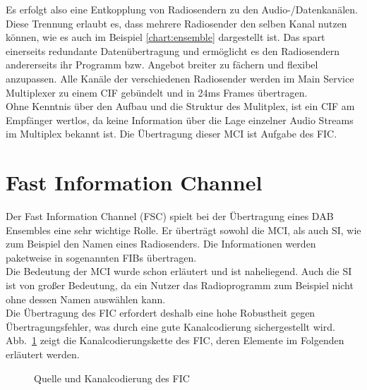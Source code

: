 Es erfolgt also eine Entkopplung von Radiosendern zu den Audio-/Datenkanälen. Diese Trennung erlaubt es, dass mehrere Radiosender den selben Kanal nutzen können, wie es auch im Beispiel \ref{chart:ensemble} dargestellt ist. Das spart einerseits redundante Datenübertragung und ermöglicht es den Radiosendern andererseits ihr Programm bzw. Angebot breiter zu fächern und flexibel anzupassen. Alle Kanäle der verschiedenen Radiosender werden im Main Service Multiplexer zu einem \ac{CIF} gebündelt und in 24ms Frames übertragen. \\
Ohne Kenntnis über den Aufbau und die Struktur des Mulitplex, ist ein \ac{CIF} am Empfänger wertlos, da keine Information über die Lage einzelner Audio Streams im Multiplex bekannt ist. Die Übertragung dieser \ac{MCI} ist Aufgabe des \ac{FIC}.

\section{Fast Information Channel}
\label{sec:FIC}
Der Fast Information Channel (FSC) spielt bei der Übertragung eines DAB Ensembles eine sehr wichtige Rolle. Er überträgt sowohl die \ac{MCI}, als auch \ac{SI}, wie zum Beispiel den Namen eines Radiosenders. Die Informationen werden paketweise in sogenannten \acp{FIB} übertragen.\\
Die Bedeutung der \ac{MCI} wurde schon erläutert und ist naheliegend. Auch die \ac{SI} ist von großer Bedeutung, da ein Nutzer das Radioprogramm zum Beispiel nicht ohne dessen Namen auswählen kann. \\
Die Übertragung des FIC erfordert deshalb eine hohe Robustheit gegen Übertragungsfehler, was durch eine gute Kanalcodierung sichergestellt wird. Abb.~\ref{chart:fic_encoder} zeigt die Kanalcodierungskette des FIC, deren Elemente im Folgenden erläutert werden.\\
\begin{figure} [htb]
\begin{center}
\end{center}
\caption{Quelle und Kanalcodierung des FIC}
\label{chart:fic_encoder}
\end{figure}

